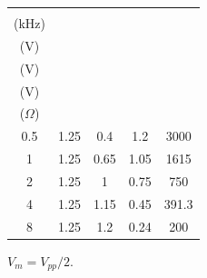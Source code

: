 \begin{center}
\begin{minipage}{\linewidth}\centering
\small
\setlength{\tabcolsep}{3pt}
\label{tab:rc}
\begin{tabular}{ccccc}
\toprule
\shortstack{$f_{\rm nom}$\\(kHz)} & \shortstack{$V_{G,m}$\\(V)} & \shortstack{$V_{R,m}$\\(V)} & \shortstack{$V_{C,m}$\\(V)} & \shortstack{$X_{C,\rm exp}$\\($\Omega$)} \\
\midrule
\num{0.5} & \num{1.25} & \num{0.4} & \num{1.2} & \num{3000} \\
\num{1} & \num{1.25} & \num{0.65} & \num{1.05} & \num{1615} \\
\num{2} & \num{1.25} & \num{1} & \num{0.75} & \num{750} \\
\num{4} & \num{1.25} & \num{1.15} & \num{0.45} & \num{391.3} \\
\num{8} & \num{1.25} & \num{1.2} & \num{0.24} & \num{200} \\
\bottomrule
\end{tabular}
\par\vspace{3pt}\begin{minipage}{.96\linewidth}\footnotesize $V_m=V_{pp}/2$.\end{minipage}
\end{minipage}
\end{center}
